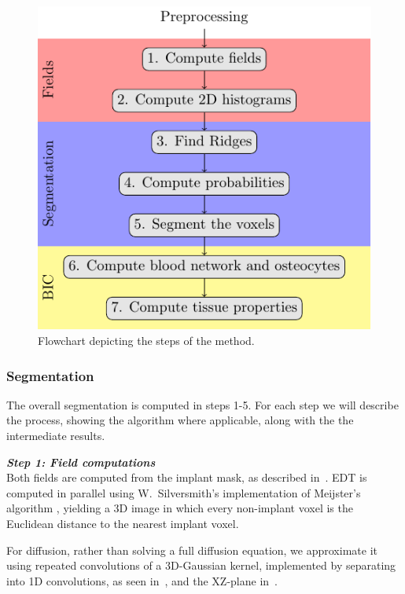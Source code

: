 \documentclass[pdflatex,sn-mathphys]{sn-jnl}%
\theoremstyle{thmstyleone}%
\theoremstyle{thmstyletwo}%
\theoremstyle{thmstylethree}%
\begin{document}
\begin{figure}
  \centering
  \includegraphics{steps}
    \caption{Flowchart depicting the steps of the method.}
    \label{fig:flowchart}
\end{figure}

\subsubsection{Segmentation}
The overall segmentation is computed in steps 1-5. For each step we will describe the process, showing
the algorithm where applicable, along with the the intermediate results.

\vspace{\baselineskip}
\noindent\textit{\textbf{Step 1: Field computations}}\\
Both fields are computed from the implant mask, as described in~.
EDT is computed in parallel using W.~Silversmith's implementation of Meijster's algorithm \cite{pypi-edt},
yielding a 3D image in which every non-implant voxel is the Euclidean distance to the nearest implant voxel.

For diffusion, rather than solving a full diffusion equation, we approximate it using repeated convolutions
of a 3D-Gaussian kernel, implemented by separating into 1D convolutions, as seen in~, and the XZ-plane in~.
\end{document}
